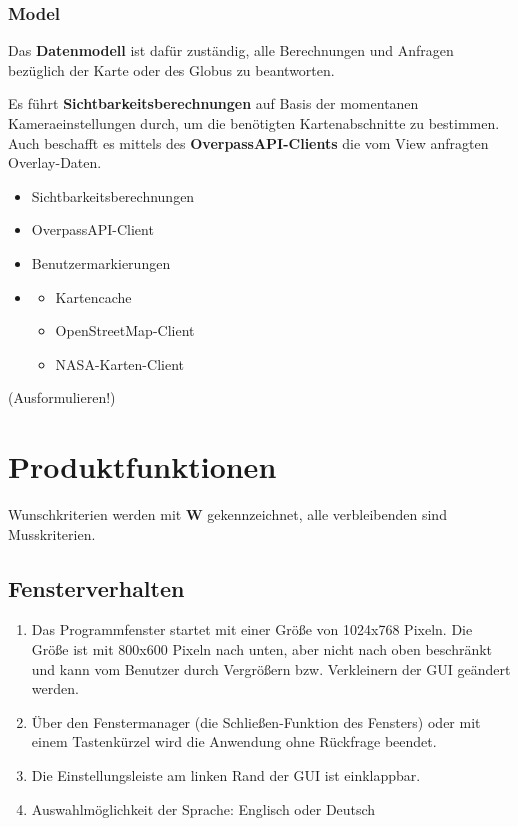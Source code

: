 \documentclass[10pt]{scrreprt}
\begin{document}
\subsection*{Model}
Das \textbf{Datenmodell} ist dafür zuständig, alle Berechnungen und Anfragen bezüglich der Karte oder des Globus zu beantworten.

Es führt \textbf{Sichtbarkeitsberechnungen} auf Basis der momentanen Kameraeinstellungen durch, um die benötigten Kartenabschnitte zu bestimmen.
Auch beschafft es mittels des \textbf{OverpassAPI-Clients} die vom View anfragten Overlay-Daten.

\begin{itemize}
\item Sichtbarkeitsberechnungen
\item OverpassAPI-Client
\item Benutzermarkierungen
\item \begin{itemize}
\item Kartencache
\item OpenStreetMap-Client
\item NASA-Karten-Client
\end{itemize}
\end{itemize}
\vspace{1cm}(Ausformulieren!)


\chapter{Produktfunktionen}

\renewcommand{\labelenumi}{\textbf{/F\numprint{\theenumi}0/}}

\newcommand{\W}{\textbf{W }}
Wunschkriterien werden mit \W  gekennzeichnet, alle verbleibenden sind Musskriterien.

\section{Fensterverhalten}
\begin{enumerate}[leftmargin=2cm]
\item Das Programmfenster startet mit einer Größe von 1024x768 Pixeln. Die Größe ist mit 800x600 Pixeln nach unten, aber nicht nach oben beschränkt und kann vom Benutzer durch Vergrößern bzw. Verkleinern der GUI geändert werden.
\item Über den Fenstermanager (die Schließen-Funktion des Fensters) oder mit einem Tastenkürzel wird die Anwendung ohne Rückfrage beendet.
\item Die Einstellungsleiste am linken Rand der GUI ist einklappbar.
\item Auswahlmöglichkeit der Sprache: Englisch oder Deutsch
\end{enumerate}
\end{document}
